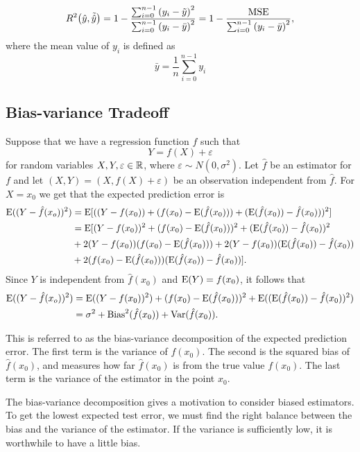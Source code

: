 \begin{equation}\label{eq:R2}
    R^2 \qty(\hat{y}, \Tilde{\hat{y}}) = 1 - \frac{\sum_{i=0}^{n-1} \qty(y_i - \Tilde{y})^2 }{\sum_{i=0}^{n-1} \qty(y_i - \bar{y})^2} = 1 - \frac{\mathrm{MSE} }{\sum_{i=0}^{n-1} \qty(y_i - \bar{y})^2},
\end{equation}
where the mean value of $y_i$ is defined as
\begin{equation*}
    \bar{y} = \frac{1}{n} \sum_{i=0}^{n-1} y_i
\end{equation*}


\subsection{Bias-variance Tradeoff}\label{sec:Bias-var theory}
Suppose that we have a regression function $f$ such that
\begin{equation*}
    Y = f(X) + \varepsilon
\end{equation*}
for random variables $X,Y,\varepsilon\in\mathbb{R}$, where $\varepsilon\sim N(0,\sigma^2)$. Let $\hat{f}$ be an estimator for $f$ and let $(X,Y)=(X,f(X)+\varepsilon)$ be an observation independent from $\hat{f}$. For $X=x_0$ we get that the expected prediction error is
\begin{align*}
    \mathrm{E}((Y-\hat{f}(x_o))^2) &= \mathrm{E}[((Y-f(x_0)) + (f(x_0) - \mathrm{E}(\hat{f}(x_0))) + (\mathrm{E}(\hat{f}(x_0)) -\hat{f}(x_0)))^2]\\ &= \mathrm{E}[(Y-f(x_0))^2+(f(x_0)-\mathrm{E}(\hat{f}(x_0)))^2 + (\mathrm{E}(\hat{f}(x_0))-\hat{f}(x_0))^2\\& + 2(Y-f(x_0))(f(x_0)-\mathrm{E}(\hat{f}(x_0))) + 2(Y-f(x_0))(\mathrm{E}(\hat{f}(x_0))-\hat{f}(x_0)) \\&+ 2(f(x_0)-\mathrm{E}(\hat{f}(x_0)))(\mathrm{E}(\hat{f}(x_0))-\hat{f}(x_0))].
\end{align*}
Since $Y$ is independent from $\hat{f}(x_0)$ and $\mathrm{E}(Y)=f(x_0)$, it follows that
\begin{align*}
    \mathrm{E}((Y-\hat{f}(x_o))^2) &= \mathrm{E}((Y-f(x_0))^2) + (f(x_0)-\mathrm{E}(\hat{f}(x_0)))^2 + \mathrm{E}((\mathrm{E}(\hat{f}(x_0))-\hat{f}(x_0))^2) \\&= \sigma^2 + \mathrm{Bias}^2(\hat{f}(x_0)) + \mathrm{Var}(\hat{f}(x_0)).
\end{align*}

This is referred to as the bias-variance decomposition of the expected prediction error. The first term is the variance of $f(x_0)$. The second is the squared bias of $\hat{f}(x_0)$, and measures how far $\hat{f}(x_0)$ is from the true value $f(x_0)$. The last term is the variance of the estimator in the point $x_0$.

The bias-variance decomposition gives a motivation to consider biased estimators. To get the lowest expected test error, we must find the right balance between the bias and the variance of the estimator. If the variance is sufficiently low, it is worthwhile to have a little bias.
